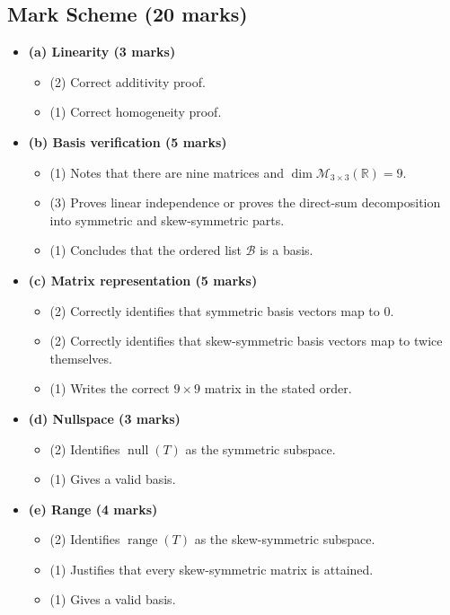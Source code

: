 \documentclass[12pt]{article}
\newcommand{\R}{\mathbb{R}}
\newcommand{\M}{\mathcal{M}}
\newcommand{\B}{\mathcal{B}}
\newcommand{\Null}{\operatorname{null}}
\newcommand{\Range}{\operatorname{range}}
\begin{document}
\subsection{Mark Scheme (20 marks)}
\begin{itemize}[leftmargin=1.6em]
  \item \textbf{(a) Linearity (3 marks)}
  \begin{itemize}[leftmargin=1.6em]
    \item (2) Correct additivity proof.
    \item (1) Correct homogeneity proof.
  \end{itemize}
  \item \textbf{(b) Basis verification (5 marks)}
  \begin{itemize}[leftmargin=1.6em]
    \item (1) Notes that there are nine matrices and $\dim\M_{3\times3}(\R)=9$.
    \item (3) Proves linear independence or proves the direct-sum decomposition into symmetric and skew-symmetric parts.
    \item (1) Concludes that the ordered list $\B$ is a basis.
  \end{itemize}
  \item \textbf{(c) Matrix representation (5 marks)}
  \begin{itemize}[leftmargin=1.6em]
    \item (2) Correctly identifies that symmetric basis vectors map to $0$.
    \item (2) Correctly identifies that skew-symmetric basis vectors map to twice themselves.
    \item (1) Writes the correct $9\times9$ matrix in the stated order.
  \end{itemize}
  \item \textbf{(d) Nullspace (3 marks)}
  \begin{itemize}[leftmargin=1.6em]
    \item (2) Identifies $\Null(T)$ as the symmetric subspace.
    \item (1) Gives a valid basis.
  \end{itemize}
  \item \textbf{(e) Range (4 marks)}
  \begin{itemize}[leftmargin=1.6em]
    \item (2) Identifies $\Range(T)$ as the skew-symmetric subspace.
    \item (1) Justifies that every skew-symmetric matrix is attained.
    \item (1) Gives a valid basis.
  \end{itemize}
\end{itemize}
\end{document}
